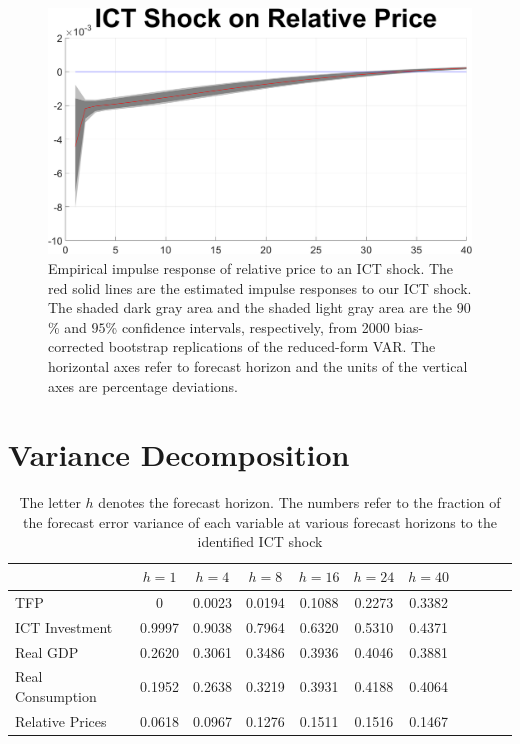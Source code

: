 \documentclass[12pt]{article}
\begin{document}
\newpage


	\begin{figure}[h!]
	\begin{center}
		\includegraphics[scale=0.35]{MainFigures/fig_ICT_Shock_on_Relative_Price_empirical_noH}
		\caption{Empirical impulse response of relative price to an ICT shock. The red solid lines are the estimated impulse responses to our ICT shock. The shaded dark gray area and the shaded light gray area are the $90$\% and $95$\% confidence intervals, respectively, from 2000 bias-corrected bootstrap replications of the reduced-form VAR. The horizontal axes refer to forecast horizon and the units of the vertical axes are percentage deviations.}
		\label{fig:RP_main}
	\end{center} 
\end{figure}




\newpage

 
 
 \section{Variance Decomposition}\label{section:vardec}

 
 
 	\begin{table}[h!]
 		\begin{center}
 \begin{tabular}{lcccccccccc}
\hline
 	& $h = 1$ & $h = 4$ & $h = 8$ & $h = 16$ & $h = 24$ & $h = 40$ \\
 	\hline
TFP &  0       &  0.0023  &  0.0194 &   0.1088 &   0.2273  &  0.3382 \\
ICT Investment &  0.9997  &  0.9038  &  0.7964 &   0.6320 &   0.5310  &  0.4371 \\
Real GDP &  0.2620  &  0.3061  &  0.3486 &   0.3936 &   0.4046  &  0.3881 \\
Real Consumption &  0.1952  &  0.2638  &  0.3219 &   0.3931 &   0.4188  &  0.4064 \\
Relative Prices &  0.0618  &  0.0967  &  0.1276 &   0.1511 &   0.1516  &  0.1467 \\	
\hline
 	\end{tabular}
  		\caption{The letter $h$ denotes the forecast horizon. The numbers refer to the fraction of the forecast error variance of each variable at various forecast horizons to the identified ICT shock}
  \label{table:vardec}
  \end{center}
 \end{table}
\end{document}
